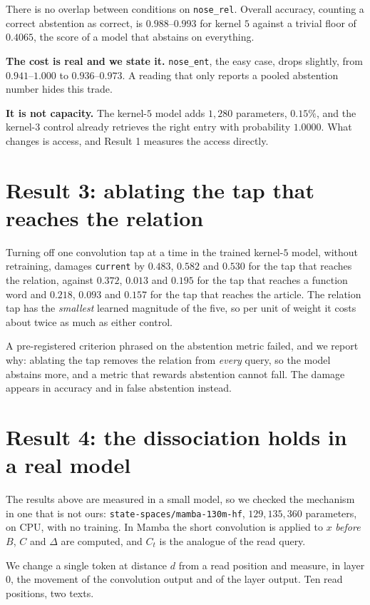 \documentclass[11pt,a4paper]{article}
\begin{document}
There is no overlap between conditions on \texttt{nose\_rel}. Overall accuracy, counting a correct
abstention as correct, is $0.988$--$0.993$ for kernel $5$ against a trivial floor of $0.4065$, the score
of a model that abstains on everything.

\textbf{The cost is real and we state it.} \texttt{nose\_ent}, the easy case, drops slightly, from
$0.941$--$1.000$ to $0.936$--$0.973$. A reading that only reports a pooled abstention number hides this
trade.

\textbf{It is not capacity.} The kernel-$5$ model adds $1{,}280$ parameters, $0.15\%$, and the kernel-$3$
control already retrieves the right entry with probability $1.0000$. What changes is access, and Result
1 measures the access directly.

\section{Result 3: ablating the tap that reaches the relation}

Turning off one convolution tap at a time in the trained kernel-$5$ model, without retraining, damages
\texttt{current} by $0.483$, $0.582$ and $0.530$ for the tap that reaches the relation, against $0.372$,
$0.013$ and $0.195$ for the tap that reaches a function word and $0.218$, $0.093$ and $0.157$ for the
tap that reaches the article. The relation tap has the \emph{smallest} learned magnitude of the five,
so per unit of weight it costs about twice as much as either control.

A pre-registered criterion phrased on the abstention metric failed, and we report why: ablating the tap
removes the relation from \emph{every} query, so the model abstains more, and a metric that rewards
abstention cannot fall. The damage appears in accuracy and in false abstention instead.

\section{Result 4: the dissociation holds in a real model}

The results above are measured in a small model, so we checked the mechanism in one that is not ours:
\texttt{state-spaces/mamba-130m-hf}, $129{,}135{,}360$ parameters, on CPU, with no training. In Mamba
the short convolution is applied to $x$ \emph{before} $B$, $C$ and $\Delta$ are computed, and $C_t$ is
the analogue of the read query.

We change a single token at distance $d$ from a read position and measure, in layer $0$, the movement
of the convolution output and of the layer output. Ten read positions, two texts.
\end{document}
